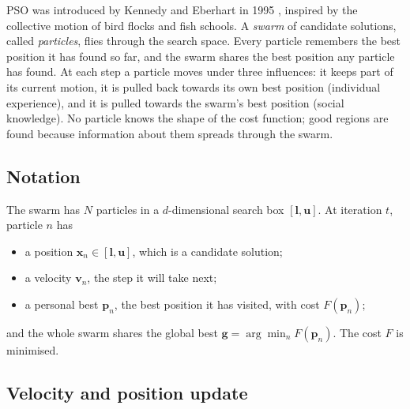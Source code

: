 \documentclass[11pt,a4paper]{article}
\begin{document}
PSO was introduced by Kennedy and Eberhart in 1995 \cite{kennedy1995}, inspired by the collective motion of
bird flocks and fish schools. A \emph{swarm} of candidate solutions, called \emph{particles}, flies through
the search space. Every particle remembers the best position it has found so far, and the swarm shares the
best position any particle has found. At each step a particle moves under three influences: it keeps part
of its current motion, it is pulled back towards its own best position (individual experience), and it is
pulled towards the swarm's best position (social knowledge). No particle knows the shape of the cost
function; good regions are found because information about them spreads through the swarm.

\subsection{Notation}

The swarm has $N$ particles in a $d$-dimensional search box $[\bm l, \bm u]$. At iteration $t$, particle
$n$ has
\begin{itemize}[nosep]
  \item a position $\bm x_n \in [\bm l, \bm u]$, which is a candidate solution;
  \item a velocity $\bm v_n$, the step it will take next;
  \item a personal best $\bm p_n$, the best position it has visited, with cost $F(\bm p_n)$;
\end{itemize}
and the whole swarm shares the global best $\bm g = \arg\min_n F(\bm p_n)$. The cost $F$ is minimised.

\subsection{Velocity and position update}
\end{document}
